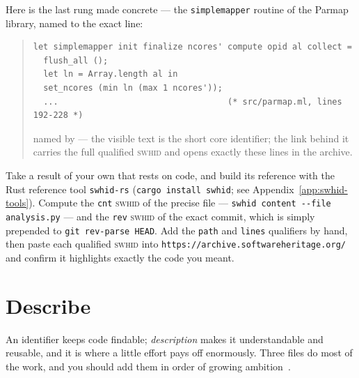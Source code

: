 Here is the last rung made concrete --- the \texttt{simplemapper} routine of the Parmap library,
named to the exact line:

\begin{quote}\footnotesize
\begin{verbatim}
let simplemapper init finalize ncores' compute opid al collect =
  flush_all ();
  let ln = Array.length al in
  set_ncores (min ln (max 1 ncores'));
  ...                                  (* src/parmap.ml, lines 192-228 *)
\end{verbatim}
\vspace{-3pt}\noindent named by
--- the visible text is the short core identifier; the link behind it carries the full qualified
\textsc{swhid} and opens exactly these lines in the archive.
\end{quote}

\begin{handson}
Take a result of your own that rests on code, and build its reference with the Rust reference tool
\texttt{swhid-rs} (\texttt{cargo install swhid}; see Appendix~\ref{app:swhid-tools}). Compute the
\texttt{cnt} \textsc{swhid} of the precise file --- \texttt{swhid content -{}-file analysis.py} ---
and the \texttt{rev} \textsc{swhid} of the exact commit, which is simply 
prepended to \texttt{git rev-parse HEAD}. Add the \texttt{path} and \texttt{lines} qualifiers by
hand, then paste each qualified \textsc{swhid} into \texttt{https://archive.softwareheritage.org/}
and confirm it highlights exactly the code you meant.
\end{handson}

\section{Describe}

An identifier keeps code findable; \emph{description} makes it understandable and reusable, and it is
where a little effort pays off enormously. Three files do most of the work, and you should add them
in order of growing ambition~\autocite{boettiger2017codemeta}.

